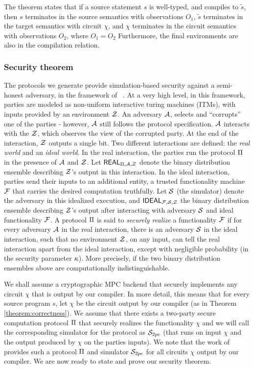 The theorem states that if a source statement $s$ is well-typed, and
compiles to $\widetilde{s}$, then $s$ terminates in the source
semantics with observations $O_{1}$, $\widetilde{s}$ terminates in the
target semantics with circuit $\chi$, and $\chi$ terminates in the
circuit semantics with observations $O_{2}$, where $O_{1} = O_{2}$
Furthermore, the final environments are also in the compilation
relation.

\subsubsection*{Security theorem} The protocols we generate provide
simulation-based security against a semi-honest adversary, in the
framework of ~\cite{gmw,can00,can01}. At a very high level, in this
framework, parties are modeled as non-uniform interactive turing
machines (ITMs), with inputs provided by an environment $\mathcal{Z}$. An
adversary $\mathcal{A}$, selects and ``corrupts'' one of the parties -
however, $\mathcal{A}$ still follows the protocol specification. $\mathcal{A}$
interacts with the $\mathcal{Z}$, which observes the view of the corrupted
party. At the end of the interaction, $\mathcal{Z}$ outputs a single bit. Two
different interactions are defined: the {\em real world} and an {\em
  ideal world}. In the real interaction, the parties run the protocol
$\Pi$ in the presence of $\mathcal{A}$ and $\mathcal{Z}$. Let
$\mathsf{REAL}_{\Pi,\mathcal{A},\mathcal{Z}}$ denote the binary distribution ensemble
describing $\mathcal{Z}$'s output in this interaction. In the ideal
interaction, parties send their inputs to an additional entity, a
trusted functionality machine $\mathcal{F}$ that carries the desired
computation truthfully. Let $\mathcal{S}$ (the simulator) denote the
adversary in this idealized execution, and $\mathsf{IDEAL}_{\mathcal{F},\mathcal{S},\mathcal{Z}}$
the binary distribution ensemble describing $\mathcal{Z}$'s output after
interacting with adversary $\mathcal{S}$ and ideal functionality $\mathcal{F}$. A
protocol $\Pi$ is said to {\em securely realize} a functionality
$\mathcal{F}$ if for every adversary $\mathcal{A}$ in the real interaction, there is
an adversary $\mathcal{S}$ in the ideal interaction, such that no
environment $\mathcal{Z}$, on any input, can tell the real interaction apart
from the ideal interaction, except with negligible probability (in the
security parameter $\kappa$). More precisely, if the two binary
distribution ensembles above are computationally indistinguishable. 

We shall assume a cryptographic MPC backend that securely implements any circuit $\chi$ that is output by our compiler. In more detail, this means that for every source program $s$, let $\chi$ be the circuit output by our compiler (as in Theorem \ref{theorem:correctness}). We assume that there exists a two-party secure computation protocol $\Pi$ that securely realizes the functionality $\chi$ and we will call the corresponding simulator for the protocol as $\simu_{\tiny{2pc}}$ (that runs on input $\chi$ and the output produced by $\chi$ on the parties inputs). We note that the work of \cite{aby} provides such a protocol $\Pi$ and simulator $\simu_{\tiny{2pc}}$ for all circuits $\chi$ output by our compiler. We are now ready to state and prove our security theorem.
 
